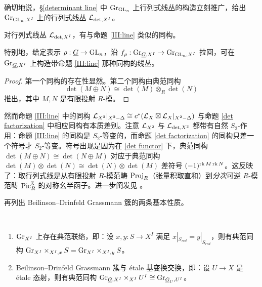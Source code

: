 确切地说，\S\ref{determinant line} 中 ${\operatorname{Gr}}_{{\operatorname{GL}}_n}$ 上行列式线丛的构造立刻推广，给出 ${\operatorname{Gr}}_{{\operatorname{GL}}_n,X^I}$ 上的行列式线丛 ${\mathcal L}_{\det, X^I}$。

\begin{prop}\label{det factorization}
对行列式线丛 ${\mathcal L}_{\det,X^I}$，有与命题 \ref{III:line} 类似的同构。
\end{prop}

特别地，给定表示 $\rho:\underline G\to {\operatorname{GL}}_n$，沿 $f_\rho: {\operatorname{Gr}}_{\underline G,X^I}\to{\operatorname{Gr}}_{{\operatorname{GL}}_n,X^I}$ 拉回，可在 ${\operatorname{Gr}}_{\underline G,X^I}$ 上构造带命题 \ref{III:line} 那种同构的线丛。

\begin{proof}
第一个同构的存在性显然。第二个同构由典范同构
\begin{equation}\label{det functor}
\det(M\oplus N)\cong \det(M)\otimes_R \det(N)
\end{equation}
推出，其中 $M,N$ 是有限投射 $R$-模。
\end{proof}

\begin{rmk}\label{graded factorization}
然而命题 \ref{III:line} 中的同构 ${\mathcal L}_{X^2}|_{X^2-\Delta}\cong c^*({\mathcal L}_X\boxtimes{\mathcal L}_X|_{X^2-\Delta})$ 与命题 \ref{det factorization} 中相应同构有本质差别。注意 ${\mathcal L}_{X^2}$ 与 ${\mathcal L}_{\det,X^2}$ 都带有自然 $S_2$-作用：命题 \ref{III:line} 的同构是 $S_2$-等变的，而命题 \ref{det factorization} 的同构只差一个符号才 $S_2$-等变。符号出现是因为在 \eqref{det functor} 下，典范同构 $\det(M\oplus N)\cong\det(N\oplus M)$ 对应于典范同构 $\det(M)\otimes\det(N)\cong\det(N)\otimes\det(M)$ 差符号 $(-1)^{\operatorname{rk}M\operatorname{rk}N}$。这反映了：取行列式线是从有限投射 $R$-模范畴 $\operatorname{Proj}_R$（张量积取直和）到\emph{分次}可逆 $R$-模范畴 ${\operatorname{Pic}}^{\mathbb Z}_R$ 的对称幺半函子。进一步阐发见 \cite{OZ1}。
\end{rmk}

再列出 Beilinson--Drinfeld Grassmann 簇的两条基本性质。

\begin{prop}\label{III:property}~
\begin{enumerate}
\item ${\operatorname{Gr}}_{X^I}$ 上存在典范联络，即：设 $x,y:S\to X^I$ 满足 $x|_{S_{red}}=y|_{S_{red}}$，则有典范同构 ${\operatorname{Gr}}_{X^I}\times_{X^I,x}S={\operatorname{Gr}}_{X^I}\times_{X^I,y}S$。
\item Beilinson--Drinfeld Grassmann 簇与 \'etale 基变换交换，即：设 $U\to X$ 是 \'etale 态射，则有典范同构 ${\operatorname{Gr}}_{\underline G,X^I}\times_{X^I}U^I\cong{\operatorname{Gr}}_{\underline G_U, U^I}$。
\end{enumerate}
\end{prop}

